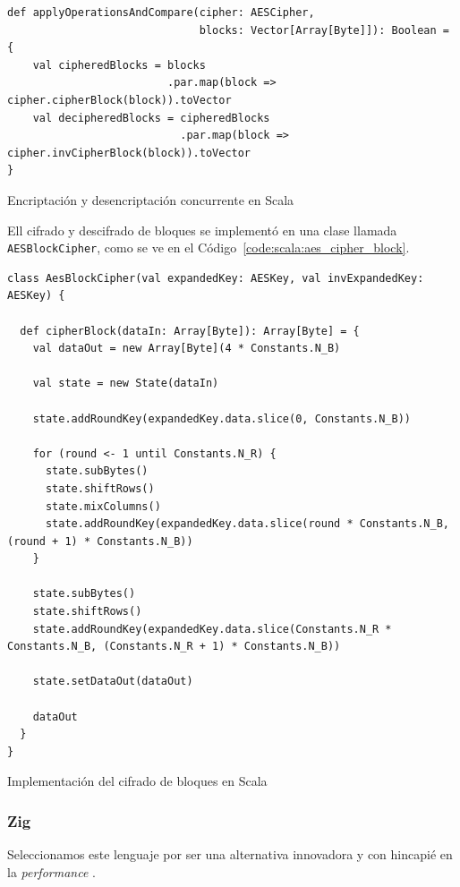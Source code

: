 \documentclass[11pt]{article}
\let\Oldsubsubsection\subsubsection
\renewcommand{\subsubsection}{\FloatBarrier\Oldsubsubsection}
\newcommand{\english}[1]{\textit{#1}}
\begin{document}
\begin{listing}[h]
\begin{verbatim}
def applyOperationsAndCompare(cipher: AESCipher,
                              blocks: Vector[Array[Byte]]): Boolean = {
    val cipheredBlocks = blocks
                         .par.map(block => cipher.cipherBlock(block)).toVector
    val decipheredBlocks = cipheredBlocks
                           .par.map(block => cipher.invCipherBlock(block)).toVector
}
\end{verbatim}
\caption{Encriptación y desencriptación concurrente en Scala}
\label{code:scala:aes_concurrent}
\end{listing}

Ell cifrado y descifrado de bloques se implementó en una clase llamada \lstinline{AESBlockCipher}, como se ve en el Código~\ref{code:scala:aes_cipher_block}.

\begin{listing}[h]
\begin{verbatim}
class AesBlockCipher(val expandedKey: AESKey, val invExpandedKey: AESKey) {

  def cipherBlock(dataIn: Array[Byte]): Array[Byte] = {
    val dataOut = new Array[Byte](4 * Constants.N_B)

    val state = new State(dataIn)

    state.addRoundKey(expandedKey.data.slice(0, Constants.N_B))

    for (round <- 1 until Constants.N_R) {
      state.subBytes()
      state.shiftRows()
      state.mixColumns()
      state.addRoundKey(expandedKey.data.slice(round * Constants.N_B, (round + 1) * Constants.N_B))
    }

    state.subBytes()
    state.shiftRows()
    state.addRoundKey(expandedKey.data.slice(Constants.N_R * Constants.N_B, (Constants.N_R + 1) * Constants.N_B))

    state.setDataOut(dataOut)

    dataOut
  }
}
\end{verbatim}
\caption{Implementación del cifrado de bloques en Scala}
\label{code:scala:aes_cipher_block}
\end{listing}

\subsubsection{Zig}

Seleccionamos este lenguaje por ser una alternativa innovadora y con hincapié en la \english{performance} \cite{zig:ex:zig_in_100_sec}.
\end{document}
